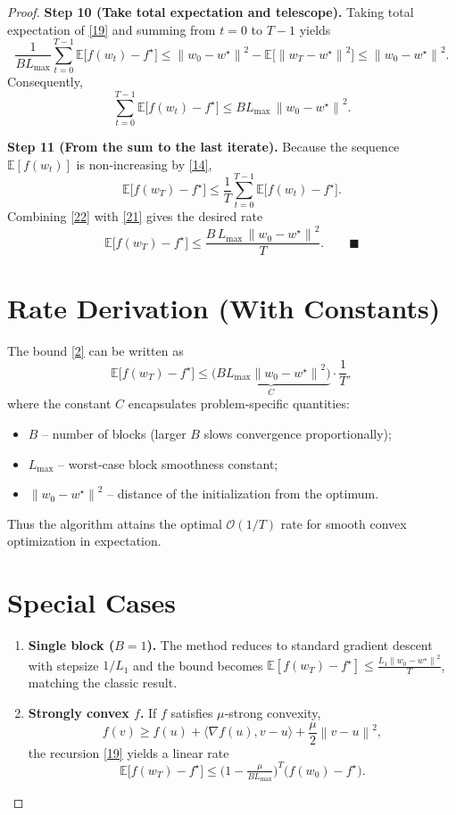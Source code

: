\documentclass{article}
\newcommand{\E}{\mathbb{E}}
\newcommand{\norm}[1]{\left\lVert #1\right\rVert}
\newcommand{\ip}[2]{\langle #1 , #2\rangle}
\begin{document}
\begin{proof}
\noindent\textbf{Step 10 (Take total expectation and telescope).}  
Taking total expectation of \eqref{19} and summing from $t=0$ to $T-1$ yields
\[
\frac{1}{B L_{\max}}\sum_{t=0}^{T-1}\E\!\bigl[f(w_{t})-f^{\star}\bigr]
\le \norm{w_{0}-w^{\star}}^{2}
   -\E\!\bigl[\norm{w_{T}-w^{\star}}^{2}\bigr]
\le \norm{w_{0}-w^{\star}}^{2}.
\tag{20}
\]
Consequently,
\[
\sum_{t=0}^{T-1}\E\!\bigl[f(w_{t})-f^{\star}\bigr]
\le B L_{\max}\,\norm{w_{0}-w^{\star}}^{2}.
\tag{21}
\]

\noindent\textbf{Step 11 (From the sum to the last iterate).}  
Because the sequence $\E[f(w_{t})]$ is non‑increasing by \eqref{14},
\[
\E\!\bigl[f(w_{T})-f^{\star}\bigr]\le
\frac{1}{T}\sum_{t=0}^{T-1}\E\!\bigl[f(w_{t})-f^{\star}\bigr].
\tag{22}
\]
Combining \eqref{22} with \eqref{21} gives the desired rate
\[
\E\!\bigl[f(w_{T})-f^{\star}\bigr]
\le \frac{B\,L_{\max}\,\norm{w_{0}-w^{\star}}^{2}}{T}.
\qquad\blacksquare
\]

\section*{Rate Derivation (With Constants)}
The bound \eqref{2} can be written as
\[
\E\!\bigl[f(w_{T})-f^{\star}\bigr]
\le \underbrace{\bigl(B L_{\max}\norm{w_{0}-w^{\star}}^{2}\bigr)}_{\displaystyle C}
\cdot\frac{1}{T},
\]
where the constant $C$ encapsulates problem‑specific quantities:
\begin{itemize}
\item $B$ – number of blocks (larger $B$ slows convergence proportionally);
\item $L_{\max}$ – worst‑case block smoothness constant;
\item $\norm{w_{0}-w^{\star}}^{2}$ – distance of the initialization from the optimum.
\end{itemize}
Thus the algorithm attains the optimal $\mathcal{O}(1/T)$ rate for smooth convex
optimization in expectation.

\section*{Special Cases}
\begin{enumerate}
\item \textbf{Single block ($B=1$).} The method reduces to standard gradient descent with stepsize $1/L_{1}$ and the bound becomes $\displaystyle \E[f(w_{T})-f^{\star}]\le \frac{L_{1}\norm{w_{0}-w^{\star}}^{2}}{T}$, matching the classic result.
\item \textbf{Strongly convex $f$.} If $f$ satisfies $\mu$‑strong convexity,
\[
f(v)\ge f(u)+\ip{\nabla f(u)}{v-u}+\frac{\mu}{2}\norm{v-u}^{2},
\]
the recursion \eqref{19} yields a linear rate
\[
\E\!\bigl[f(w_{T})-f^{\star}\bigr]
\le \bigl(1-\tfrac{\mu}{B L_{\max}}\bigr)^{T}\!\bigl(f(w_{0})-f^{\star}\bigr).
\]
\end{enumerate}


\end{proof}
\end{document}
